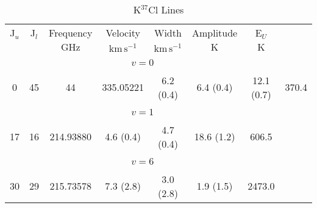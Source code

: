 \begin{table*}[htp]
\centering
\caption{K$^{37}$Cl Lines}
\begin{tabular}{ccccccc}
\label{tab:K37Cl_salt_lines}
 J$_u$ & J$_l$ & Frequency & Velocity & Width & Amplitude & E$_U$ \\
  &  & $\mathrm{GHz}$ & $\mathrm{km\,s^{-1}}$ & $\mathrm{km\,s^{-1}}$ & $\mathrm{K}$ & $\mathrm{K}$ \\
\hline
&\vspace{-0.75em}\\
 \\
\vspace{-0.75em}\\
0 & 45 & 44 & 335.05221 & 6.2 (0.4) & 6.4 (0.4) & 12.1 (0.7) & 370.4 \\
&\vspace{-0.75em}\\
 \\
\vspace{-0.75em}\\
 17 & 16 & 214.93880 & 4.6 (0.4) & 4.7 (0.4) & 18.6 (1.2) & 606.5 \\
\hline
&\vspace{-0.75em}\\
 \\
\vspace{-0.75em}\\
 30 & 29 & 215.73578 & 7.3 (2.8) & 3.0 (2.8) & 1.9 (1.5) & 2473.0 \\
\end{tabular}

\par 
\end{table*}
